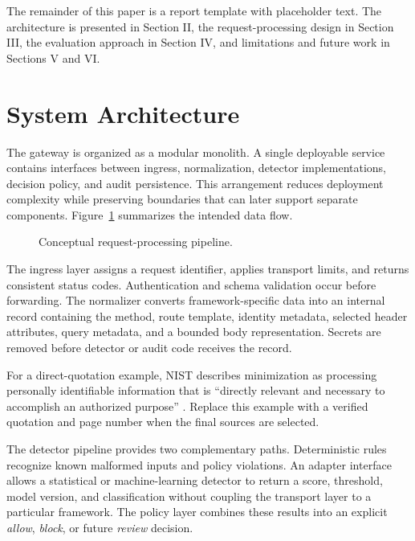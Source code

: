 \documentclass[conference]{IEEEtran}
\begin{document}
The remainder of this paper is a report template with placeholder text. The
architecture is presented in Section II, the request-processing design in
Section III, the evaluation approach in Section IV, and limitations and future
work in Sections V and VI.

\section{System Architecture}
The gateway is organized as a modular monolith. A single deployable service
contains interfaces between ingress, normalization, detector implementations,
decision policy, and audit persistence. This arrangement reduces deployment
complexity while preserving boundaries that can later support separate
components. Figure~\ref{fig:pipeline} summarizes the intended data flow.

\begin{figure}[!t]
\centering
{}
\caption{Conceptual request-processing pipeline.}
\label{fig:pipeline}
\end{figure}

The ingress layer assigns a request identifier, applies transport limits, and
returns consistent status codes. Authentication and schema validation occur
before forwarding. The normalizer converts framework-specific data into an
internal record containing the method, route template, identity metadata,
selected header attributes, query metadata, and a bounded body representation.
Secrets are removed before detector or audit code receives the record.

For a direct-quotation example, NIST describes minimization as processing
personally identifiable information that is “directly relevant and necessary
to accomplish an authorized purpose” \cite[p.~33]{nist80053}. Replace this
example with a verified quotation and page number when the final sources are
selected.

The detector pipeline provides two complementary paths. Deterministic rules
recognize known malformed inputs and policy violations. An adapter interface
allows a statistical or machine-learning detector to return a score,
threshold, model version, and classification without coupling the transport
layer to a particular framework. The policy layer combines these results into
an explicit \textit{allow}, \textit{block}, or future \textit{review} decision.
\end{document}
